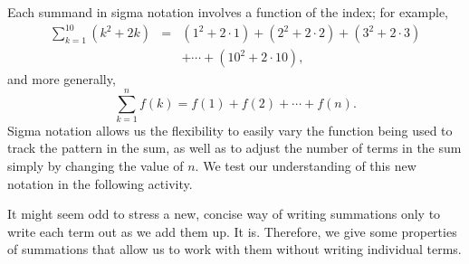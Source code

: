 Each summand in sigma notation involves a function of the index; for example,
\begin{eqnarray*}
\sum_{k=1}^{10} (k^2 + 2k) & = & (1^2 + 2\cdot 1) + (2^2 + 2\cdot 2) + (3^2 + 2\cdot 3) \\
& & + \cdots + (10^2 + 2\cdot 10),
\end{eqnarray*}
and more generally,
$$\sum_{k=1}^n f(k) = f(1) + f(2) + \cdots + f(n).$$
Sigma notation allows us the flexibility to easily vary the function being used to track the pattern in the sum, as well as to adjust the number of terms in the sum simply by changing the value of $n$.  We test our understanding of this new notation in the following activity.


It might seem odd to stress a new, concise way of writing summations only to write each term out as we add them up. It is. Therefore, we give some properties of summations that allow us to work with them without writing individual terms. 

\pagebreak



